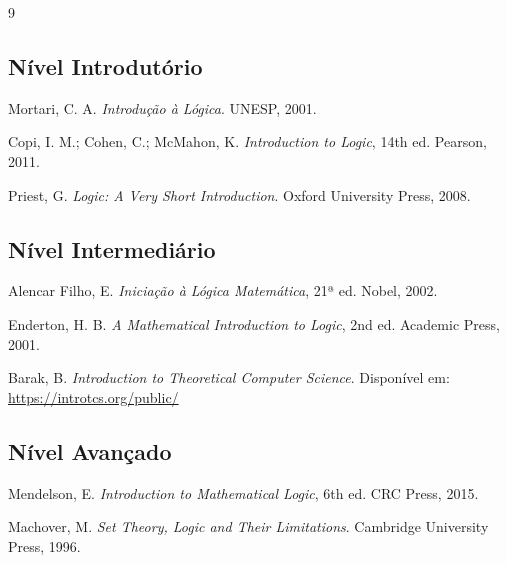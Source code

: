 \documentclass{article}
\begin{document}
\begin{thebibliography}{9}

\subsection*{Nível Introdutório}

Mortari, C. A.
\textit{Introdução à Lógica}.
UNESP, 2001.

Copi, I. M.; Cohen, C.; McMahon, K.
\textit{Introduction to Logic}, 14th ed.
Pearson, 2011.

Priest, G.
\textit{Logic: A Very Short Introduction}.
Oxford University Press, 2008.

\subsection*{Nível Intermediário}

Alencar Filho, E.
\textit{Iniciação à Lógica Matemática}, 21ª ed.
Nobel, 2002.

Enderton, H. B.
\textit{A Mathematical Introduction to Logic}, 2nd ed.
Academic Press, 2001.

Barak, B.
\textit{Introduction to Theoretical Computer Science}.
Disponível em: \url{https://introtcs.org/public/}

\subsection*{Nível Avançado}

Mendelson, E.
\textit{Introduction to Mathematical Logic}, 6th ed.
CRC Press, 2015.

Machover, M.
\textit{Set Theory, Logic and Their Limitations}.
Cambridge University Press, 1996.

\end{thebibliography}
\end{document}
